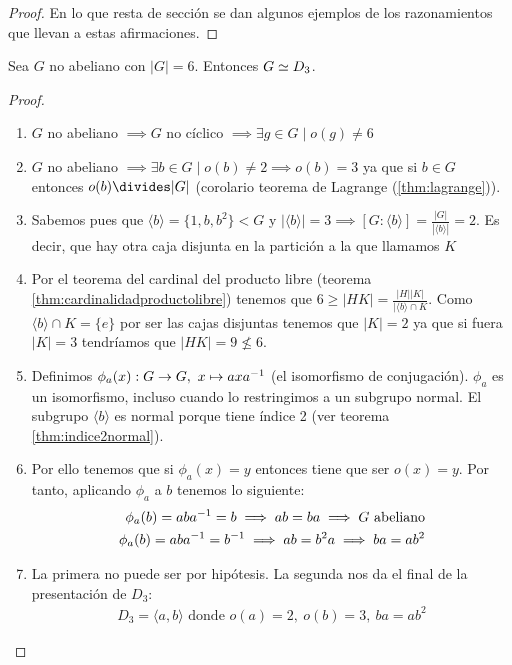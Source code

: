 \begin{proof}
	En lo que resta de sección se dan algunos ejemplos de los razonamientos que llevan a estas afirmaciones.
\end{proof}

\begin{ej}
	\label{ej:orden6noabisomd3}
	Sea $G$ no abeliano con $|G| = 6$. Entonces $G \simeq D_3$.
\end{ej}

\begin{proof}
	\begin{enumerate}
		\item $G$ no abeliano $\implies G$ no cíclico $\implies \exists g \in G \mid o(g) \neq 6$
		\item $G$ no abeliano $\implies \exists b \in G \mid o(b) \neq 2 \implies o(b) = 3$ ya que si $b \in G$ entonces $o(b) \divides |G|$ (corolario teorema de Lagrange (\ref{thm:lagrange})).
		\item Sabemos pues que $\langle b \rangle = \{1, b, b^2\} < G$ y $|\langle b \rangle| = 3 \implies [G:\langle b \rangle] = \frac{|G|}{|\langle b \rangle|} = 2$. Es decir, que hay otra caja disjunta en la partición a la que llamamos $K$
		\item Por el teorema del cardinal del producto libre (teorema \ref{thm:cardinalidadproductolibre}) tenemos que $6 \geq |HK| = \frac{|H||K|}{|\langle b \rangle \cap K}$. Como $\langle b \rangle \cap K = \{e\}$ por ser las cajas disjuntas tenemos que $|K| = 2$ ya que si fuera $|K| = 3$ tendríamos que $|HK| = 9 \not \leq 6$.
		\item Definimos $\phi_a(x) : G \to G,\ x \mapsto axa^{-1}$ (el isomorfismo de conjugación). $\phi_a$ es un isomorfismo, incluso cuando lo restringimos a un subgrupo normal. El subgrupo $\langle b \rangle$ es normal porque tiene índice 2 (ver teorema \ref{thm:indice2normal}).
		\item Por ello tenemos que si $\phi_a(x) = y$ entonces tiene que ser $o(x) = y$. Por tanto, aplicando $\phi_a$ a $b$ tenemos lo siguiente:
		\begin{align*}
		\phi_a(b) = aba^{-1} = b \implies ab = ba \implies G \text{ abeliano} \\
		\phi_a(b) = aba^{-1} = b^{-1} \implies ab = b^2a \implies ba = ab^2
		\end{align*}
		\item La primera no puede ser por hipótesis. La segunda nos da el final de la presentación de $D_3$:
		\begin{align*}
		D_3 = \langle a, b \rangle \text{ donde } o(a) = 2,\ o(b) = 3,\ ba = ab^2
		\end{align*}
	\end{enumerate}
\end{proof}

